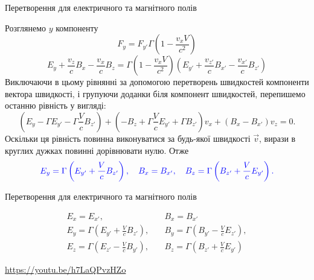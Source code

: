 \documentclass[]{beamer}
\let\vect\vec
\begin{document}
\begin{frame}{Перетворення для електричного та магнітного полів}{}
\begin{overprint}
\begin{block}{}
			Розглянемо $ y $ компоненту
			\begin{equation*}
				F_y = F_{y'}\Gamma\left( 1 - \frac{v_xV}{c^2}\right)
			\end{equation*}
			\begin{equation*}
				E_y + \frac{v_z}{c}B_x - \frac{v_x}{c}B_z = \Gamma\left( 1 - \frac{v_xV}{c^2}\right) \left( E_{y'} + \frac{v_{z'}}{c}B_{x'} -
				\frac{v_{x'}}{c}B_{z'} \right)
			\end{equation*}
			Виключаючи в цьому рівнянні за допомогою перетворень швидкостей компоненти вектора швидкості, і групуючи доданки біля компонент швидкостей,
			перепишемо останню рівність у вигляді:
			\begin{equation*}
				\left( E_y  - \Gamma E_{y'} -\Gamma\frac{V}{c}B_{z'}\right) +
				\left( - B_z +\Gamma\frac{V}{c}E_{y'} +\Gamma B_{z'}\right)v_x +
				\left( B_x - B_{x'}\right)v_z = 0.
			\end{equation*}
			Оскільки ця рівність повинна виконуватися за будь-якої швидкості $ \vect{v} $, вирази в круглих дужках повинні дорівнювати нулю. Отже
			\begin{equation*}\color{blue}
				E_y = \Gamma\left( E_{y'} + \frac{V}{c}B_{z'}\right), \quad B_x = B_{x'}, \quad  B_z = \Gamma\left(B_{z'} + \frac{V}{c}E_{y'} \right).
			\end{equation*}
		\end{block}
		\begin{block}{}
		Перетворення для електричного та магнітного полів
		\begin{tcolorbox}[sharp corners, colframe=blue!50!black, colback=white,  top=0pt]
			{ \color{blue}
				\begin{align*}
					E_x = E_{x'},                                         & \quad B_x = B_{x'} \\
					E_y = \Gamma\left( E_{y'} + \frac{V}{c}B_{z'}\right), & \quad
					B_y = \Gamma\left( B_{y'} - \frac{V}{c}E_{z'}\right) ,                     \\
					E_z = \Gamma\left( E_{z'} - \frac{V}{c}B_{y'}\right), & \quad
					B_z = \Gamma\left( B_{z'} + \frac{V}{c}E_{y'}\right)
				\end{align*}
			}
		\end{tcolorbox}
		\end{block}
		{\url{https://youtu.be/h7LaQPvzHZo}}
	\end{overprint}
\end{frame}
\end{document}
